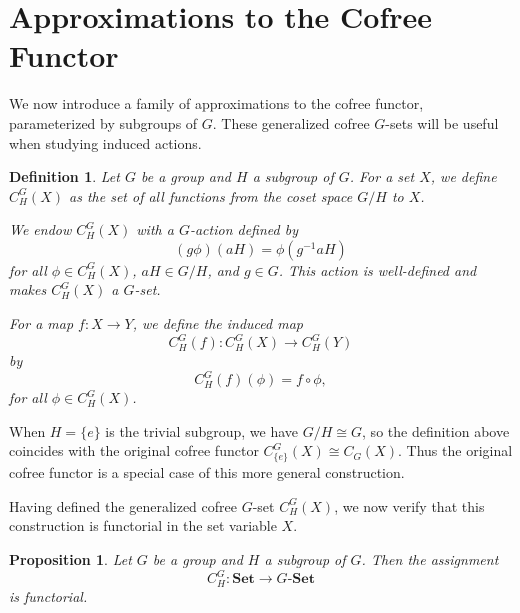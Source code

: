 \documentclass{amsart}
\newtheorem{proposition}{Proposition}
\newtheorem{definition}{Definition}
\begin{document}
\section{Approximations to the Cofree Functor}
\label{sec:approx}

We now introduce a family of approximations to the cofree functor, parameterized by subgroups of $G$. These generalized cofree $G$-sets will be useful when studying induced actions.

\begin{definition}\label{def:cofree_induced}
Let $G$ be a group and $H$ a subgroup of $G$. For a set $X$, we define $C_H^G(X)$ as the set of all functions from the coset space $G/H$ to $X$.

We endow $C_H^G(X)$ with a $G$-action defined by
\[
(g \phi)(aH) = \phi(g^{-1}aH)
\]
for all $\phi \in C_H^G(X)$, $aH \in G/H$, and $g \in G$. This action is well-defined and makes $C_H^G(X)$ a $G$-set.

For a map $f \colon X \longrightarrow Y$, we define the induced map
\[
C_H^G(f) \colon C_H^G(X) \longrightarrow C_H^G(Y)
\]
by
\[
C_H^G(f)(\phi) = f \circ \phi,
\]
for all $\phi \in C_H^G(X)$.
\end{definition}

When $H = \{e\}$ is the trivial subgroup, we have $G/H \cong G$, so the definition above coincides with the original cofree functor $C_{\{e\}}^G(X) \cong C_G(X)$. Thus the original cofree functor is a special case of this more general construction.

Having defined the generalized cofree $G$-set $C_H^G(X)$, we now verify that this construction is functorial in the set variable $X$.

\begin{proposition}\label{prop:cofree_induced_functor}
Let $G$ be a group and $H$ a subgroup of $G$. Then the assignment
\[
C_H^G \colon \mathbf{Set} \longrightarrow G\text{-}\mathbf{Set}
\]
is functorial.
\end{proposition}
\end{document}

